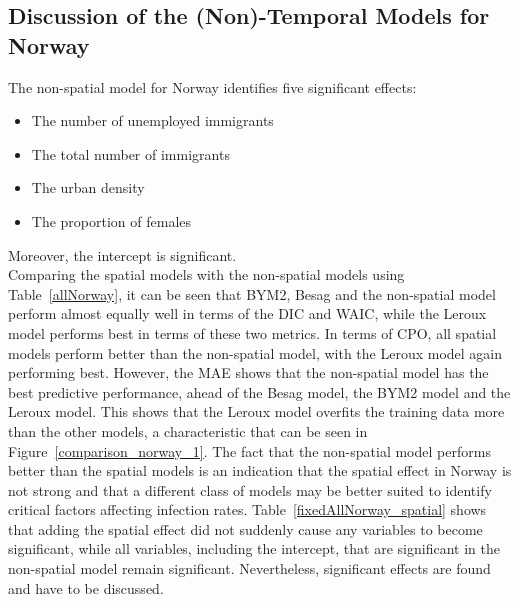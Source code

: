 \subsection{Discussion of the (Non)-Temporal Models for Norway}\label{sec:models_norway}
The non-spatial model for Norway identifies five significant effects:
\begin{itemize}
    \item The number of unemployed immigrants 
    \item The total number of immigrants 
    \item The urban density 
    \item The proportion of females 
\end{itemize}
Moreover, the intercept is significant. \\
Comparing the spatial models with the non-spatial models using Table~\ref{allNorway}, it can be seen that BYM2, Besag and the non-spatial model perform almost equally well in terms of the DIC and WAIC, while the Leroux model performs best in terms of these two metrics. In terms of CPO, all spatial models perform better than the non-spatial model, with the Leroux model again performing best. However, the MAE shows that the non-spatial model has the best predictive performance, ahead of the Besag model, the BYM2 model and the Leroux model. This shows that the Leroux model overfits the training data more than the other models, a characteristic that can be seen in Figure~\ref{comparison_norway_1}. The fact that the non-spatial model performs better than the spatial models is an indication that the spatial effect in Norway is not strong and that a different class of models may be better suited to identify critical factors affecting infection rates. Table~\ref{fixedAllNorway_spatial} shows that adding the spatial effect did not suddenly cause any variables to become significant, while all variables, including the intercept, that are significant in the non-spatial model remain significant. Nevertheless, significant effects are found and have to be discussed. \\
